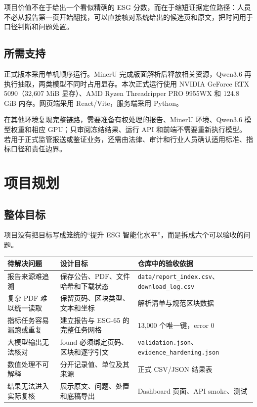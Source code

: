 \documentclass[UTF8,a4paper,11pt]{ctexart}
\begin{document}
项目价值不在于给出一个看似精确的 ESG 分数，而在于缩短证据定位路径：人员不必从报告第一页开始翻找，可以直接核对系统给出的候选页和原文，把时间用于口径判断和问题处置。\par

\subsection{所需支持}

正式版本采用单机顺序运行。MinerU 完成版面解析后释放相关资源，Qwen3.6 再执行抽取，两类模型不同时占用显存。本次正式运行使用 NVIDIA GeForce RTX 5090（32,607 MiB 显存）、AMD Ryzen Threadripper PRO 9955WX 和 124.8 GiB 内存。网页端采用 React/Vite，服务端采用 Python。\par

在其他环境复现完整链路，需要准备有权处理的报告、MinerU 环境、Qwen3.6 模型权重和相应 GPU；只审阅冻结结果、运行 API 和前端不需要重新执行模型。若用于正式监管报送或鉴证业务，还需由法律、审计和行业人员确认适用标准、指标口径和责任边界。\par

\section{项目规划}

\subsection{整体目标}

项目没有把目标写成笼统的“提升 ESG 智能化水平”，而是拆成六个可以验收的问题。\par

\begin{center}
\small
\setlength{\tabcolsep}{4pt}
\begin{tabularx}{\textwidth}{@{}YYY@{}}
\toprule
{} \textbf{待解决问题} & \textbf{设计目标} & \textbf{仓库中的验收依据} \\
\midrule
报告来源难追溯 & 保存公告、PDF、文件哈希和下载状态 & \texttt{data/report\_index.csv}、\texttt{download\_log.csv} \\
\addlinespace[2pt]
复杂 PDF 难以统一读取 & 保留页码、区块类型、文本和坐标 & 解析清单与规范区块数据 \\
\addlinespace[2pt]
指标任务容易漏跑或重复 & 建立报告与 ESG-65 的完整任务网格 & 13,000 个唯一键，error 0 \\
\addlinespace[2pt]
大模型输出无法核对 & found 必须绑定页码、区块和逐字引文 & \texttt{validation.json}、\texttt{evidence\_hardening.json} \\
\addlinespace[2pt]
数值处理不可解释 & 分开记录值、单位及其来源 & 正式 CSV/JSON 结果表 \\
\addlinespace[2pt]
结果无法进入实际复核 & 展示原文、问题、处置和底稿导出 & Dashboard 页面、API smoke、测试 \\
\bottomrule
\end{tabularx}
\end{center}
\end{document}
